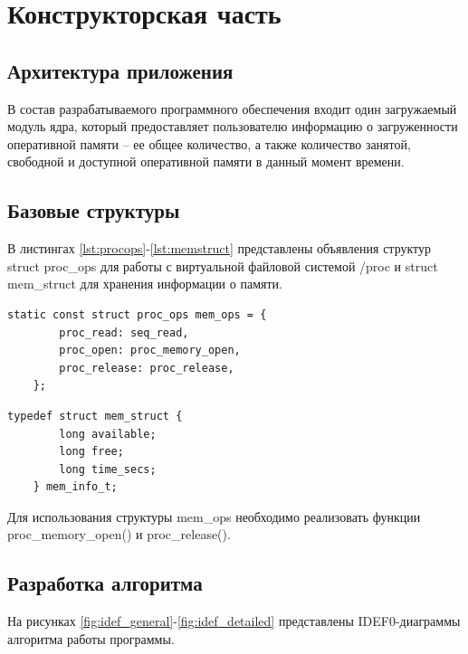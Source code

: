 \section{Конструкторская часть}

\subsection{Архитектура приложения}

В состав разрабатываемого программного обеспечения входит один загружаемый модуль ядра, который предоставляет пользователю информацию о загруженности оперативной памяти -- ее общее количество, а также количество занятой, свободной и доступной оперативной памяти в данный момент времени.

\subsection{Базовые структуры}

В листингах \ref{lst:procops}-\ref{lst:memstruct} представлены объявления структур struct proc\_ops для работы с виртуальной файловой системой /proc и struct mem\_struct для хранения информации о памяти.

\begin{lstlisting}[label={lst:procops}, caption={структура struct proc\_ops}]
	static const struct proc_ops mem_ops = {
		proc_read: seq_read,
		proc_open: proc_memory_open,
		proc_release: proc_release,
	};
\end{lstlisting}

\begin{lstlisting}[label={lst:memstruct}, caption={структура struct mem\_struct}]
	typedef struct mem_struct {
		long available;
		long free;
		long time_secs;
	} mem_info_t;
\end{lstlisting}

Для использования структуры mem\_ops необходимо реализовать функции proc\_memory\_open() и proc\_release().

\subsection{Разработка алгоритма}

На рисунках \ref{fig:idef_general}-\ref{fig:idef_detailed} представлены IDEF0-диаграммы алгоритма работы программы.

